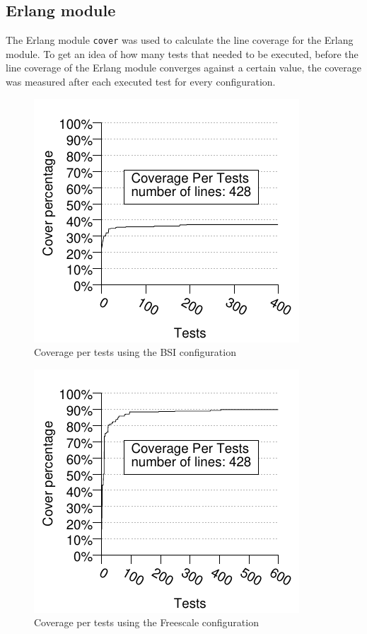 \subsection{Erlang module}
\newcommand{\linecoverage}{97.38\%}
\newcommand{\bullseyecoverage}{85.64\%}
The Erlang module \lstinline!cover! was used to calculate the line
coverage for the Erlang module. To get an idea of how many tests that
needed to be executed, before the line coverage of the Erlang module
converges against a certain value, the coverage was measured after
each executed test for every configuration.

\begin{figure}[!ht]
\begin{center}
\includegraphics{generated_pictures/coverage_per_tests_bsi.pdf}
\end{center}
\caption{Coverage per tests using the BSI configuration}
\label{FIG:COV_PER_TESTS_BSI}
\end{figure}

\begin{figure}[!ht]
\begin{center}
\includegraphics{generated_pictures/coverage_per_tests_freescale.pdf}
\end{center}
\caption{Coverage per tests using the Freescale configuration}
\label{FIG:COV_PER_TESTS_FREESCALE}
\end{figure}


